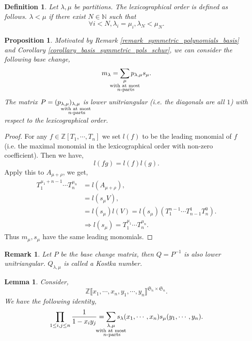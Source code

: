 \documentclass{article}
\newtheorem{proposition}{Proposition}[section]
\newtheorem{definition}{Definition}[section]
\newtheorem{lemma}{Lemma}[section]
\newtheorem{remark}{Remark}[section]
\numberwithin{equation}{theorem}
\newcommand{\N}[0]{\mathbb{N}}
\newcommand{\Z}[0]{\mathbb{Z}}
\begin{document}
\begin{definition}
    Let $\lambda,\mu$ be partitions. The lexicographical order is defined as follows. $\lambda<\mu$ if there exist $N\in\N$ such that 
    \begin{equation*}
        \forall i<N, \lambda_i=\mu_i,\lambda_N<\mu_N.
    \end{equation*}
\end{definition}
\begin{proposition}
    Motivated by Remark \ref{remark_symmetric_polynomials_basis} and Corollary \ref{corollary_basis_symmetric_pols_schur}, we can consider the following base change,
    \begin{equation*}
        m_\lambda = \sum_{\substack{\mu\\\text{\makebox[0pt][c]{with at most}}\\\text{\makebox[0pt][c]{ $n$-parts}}}} p_{\lambda,\mu}s_\mu.
    \end{equation*}
    The matrix $P=(p_{\lambda,\mu})_{\substack{\lambda,\mu\\\text{\makebox[0pt][c]{with at most}}\\\text{\makebox[0pt][c]{ $n$-parts}}}}$ is lower unitriangular (i.e. the diagonals are all $1$) with respect to the lexicographical order.
\end{proposition}
\begin{proof}
    For any $f\in\Z[T_1,\cdots,T_n]$ we set $l(f)$ to be the leading monomial of $f$ (i.e. the maximal monomial in the lexicographical order with non-zero coefficient). Then we have,
    \begin{equation*}
        l(fg) = l(f)l(g).
    \end{equation*} 
    Apply this to $A_{\mu+\rho}$, we get,
    \begin{align*}
        T_1^{\mu_1+n-1}\cdots T_n^{\mu_n} &= l(A_{\mu+\rho}),\\
        & = l(s_\mu V),\\
        & = l(s_\mu)l(V) = l(s_\mu)(T_1^{n-1}\cdots T_{n-1}^1T_n^0).\\
        &\Rightarrow l(s_\mu) = T_1^{\mu_1}\cdots T_n^{\mu_n}.
    \end{align*}
    Thus $m_\mu,s_\mu$ have the same leading monomials. 
\end{proof}
\begin{remark}
    Let $P$ be the base change matrix, then $Q=P^{-1}$ is also lower unitriangular. $Q_{\lambda,\mu}$ is called a Kostka number.
\end{remark}
\begin{lemma}
    Consider,
    \begin{equation*}
        \Z\llbracket x_1,\cdots,x_n,y_1,\cdots,y_n\rrbracket^{\mathfrak{S}_n\times\mathfrak{S}_n}.
    \end{equation*}
    We have the following identity,
    \begin{equation*}
        \prod_{1\leq i,j\leq n}{\frac 1 {1-x_iy_j}} = \sum_{\substack{\lambda,\mu\\\text{\makebox[0pt][c]{with at most}}\\\text{\makebox[0pt][c]{ $n$-parts}}}}s_\lambda(x_1,\cdots,x_n)s_\mu(y_1,\cdots,y_n).
    \end{equation*}
\end{lemma}
\end{document}

